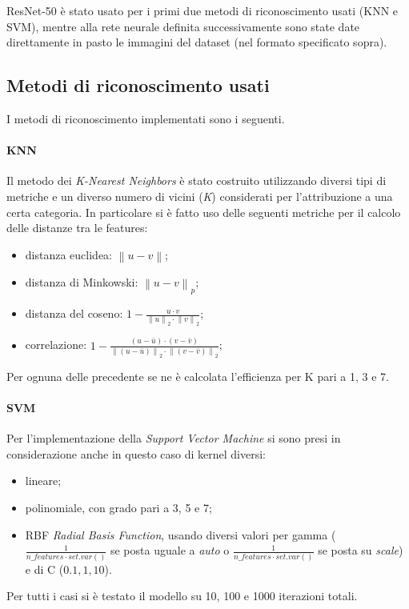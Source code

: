 \documentclass[11pt, a4paper, titlepage]{article}
\begin{document}
ResNet-50 è stato usato per i primi due metodi di riconoscimento usati (KNN e SVM), mentre alla rete neurale definita successivamente sono state date direttamente in pasto le immagini del dataset (nel formato specificato sopra).
 
\subsection{Metodi di riconoscimento usati}
I metodi di riconoscimento implementati sono i seguenti. 

\paragraph{KNN}
Il metodo dei \emph{K-Nearest Neighbors} è stato costruito utilizzando diversi tipi di metriche e un diverso numero di vicini (\emph{K}) considerati per l'attribuzione a una certa categoria. In particolare si è fatto uso delle seguenti metriche per il calcolo delle distanze tra le features:
\begin{itemize}
    \item distanza euclidea: 
    \begin{math} \left \| u - v \right \| \end{math};
    \item distanza di Minkowski:
    \begin{math} \left \| u - v \right \|_p \end{math};
    \item distanza del coseno: 
    \begin{math} 1 - \frac{u \cdot v}{\left \| u \right \|_2 \cdot \left \| v \right \|_2} \end{math};
    \item correlazione: 
    \begin{math} 1 - \frac{(u - \bar u) \cdot (v - \bar v)}{\left \| (u - \bar u) \right \|_2 \cdot \left \| (v - \bar v) \right \|_2} \end{math};
\end{itemize}
Per ognuna delle precedente se ne è calcolata l'efficienza per K pari a 1, 3 e 7.

\paragraph{SVM}
Per l'implementazione della \emph{Support Vector Machine} si sono presi in considerazione anche in questo caso di kernel diversi:
\begin{itemize}
    \item lineare; 
    \item polinomiale, con grado pari a 3, 5 e 7;
    \item RBF \emph{Radial Basis Function}, usando diversi valori per gamma ($\frac{1}{n\_features \cdot set.var()}$ se posta uguale a \emph{auto} o $\frac{1}{n\_features \cdot set.var()}$ se posta su \emph{scale}) e di C ($0.1, 1, 10$).
\end{itemize}
Per tutti i casi si è testato il modello su 10, 100 e 1000 iterazioni totali.
\end{document}
